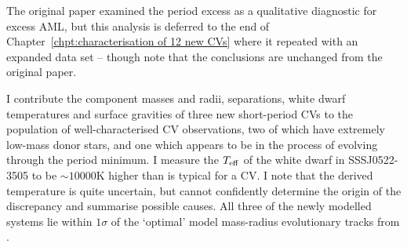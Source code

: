 The original paper \citep{wild2021} examined the period excess as a qualitative diagnostic for excess AML, but this analysis is deferred to the end of Chapter~\ref{chpt:characterisation of 12 new CVs} where it repeated with an expanded data set -- though note that the conclusions are unchanged from the original paper.

I contribute the component masses and radii, separations, white dwarf temperatures and surface gravities of three new short-period CVs to the population of well-characterised CV observations, two of which have extremely low-mass donor stars, and one which appears to be in the process of evolving through the period minimum.
I measure the $T_{\rm eff}$ of the white dwarf in SSSJ0522-3505 to be $\sim10000$K higher than is typical for a CV. I note that the derived temperature is quite uncertain, but cannot confidently determine the origin of the discrepancy and summarise possible causes.
All three of the newly modelled systems lie within $1\sigma$ of the `optimal' model mass-radius evolutionary tracks from \citet{knigge11}.
